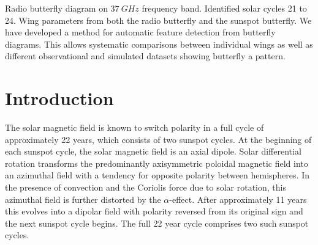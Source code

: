 \documentclass{aa}
\begin{document}
  {
    Radio butterfly diagram on $\SI{37}{GHz}$ frequency band.
    Identified solar cycles 21 to 24.
    Wing parameters from both the radio butterfly and the sunspot butterfly.
  }
  {
    We have developed a method for automatic feature detection from butterfly
    diagrams.
    This allows systematic comparisons between individual wings as well as
    different observational and simulated datasets showing butterfly a pattern.
  }


  \maketitle

\section{Introduction}

  The solar magnetic field is known to switch polarity in a full cycle of 
  approximately %
  22 years, which consists of two sunspot cycles.
  At %
  the beginning of each sunspot cycle, the solar magnetic field is an axial
  dipole.
  Solar differential rotation transforms the predominantly axisymmetric
  poloidal magnetic field into an azimuthal field with a 
  tendency
  for opposite
  polarity between hemispheres.
  In the presence of convection and the Coriolis force due to solar rotation,
  this azimuthal field is further distorted by the
  $\alpha$-effect.
  After approximately 11 years this evolves into a dipolar field with
  polarity reversed from its original sign
  and the next sunspot cycle begins.
  The full 22 year cycle comprises two such sunspot cycles.
\end{document}
